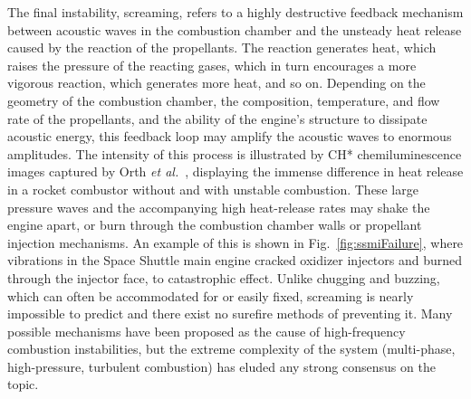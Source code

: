 The final instability, screaming, refers to a highly destructive feedback mechanism between acoustic waves in the combustion chamber and the unsteady heat release caused by the reaction of the propellants. The reaction generates heat, which raises the pressure of the reacting gases, which in turn encourages a more vigorous reaction, which generates more heat, and so on. Depending on the geometry of the combustion chamber, the composition, temperature, and flow rate of the propellants, and the ability of the engine's structure to dissipate acoustic energy, this feedback loop may amplify the acoustic waves to enormous amplitudes. The intensity of this process is illustrated by CH* chemiluminescence images captured by Orth \textit{et al.}~\cite{Orth2018}, displaying the immense difference in heat release in a rocket combustor without and with unstable combustion. These large pressure waves and the accompanying high heat-release rates may shake the engine apart, or burn through the combustion chamber walls or propellant injection mechanisms. An example of this is shown in Fig.~\ref{fig:ssmiFailure}, where vibrations in the Space Shuttle main engine cracked oxidizer injectors and burned through the injector face, to catastrophic effect. Unlike chugging and buzzing, which can often be accommodated for or easily fixed, screaming is nearly impossible to predict and there exist no surefire methods of preventing it. Many possible mechanisms have been proposed as the cause of high-frequency combustion instabilities, but the extreme complexity of the system (multi-phase, high-pressure, turbulent combustion) has eluded any strong consensus on the topic.

